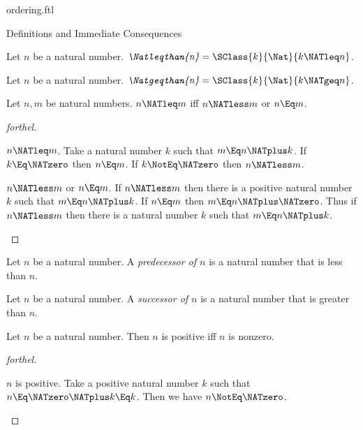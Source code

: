 \documentclass{stex}
\begin{document}
\begin{smodule}{ordering.ftl}
\begin{sfragment}{Definitions and Immediate Consequences}
  \begin{definition}[forthel]
    Let $n$ be a natural number.
    $\emph{\Natleqthan{n}} = \SClass{k}{\Nat}{k \NATleq n}$.
  \end{definition}

  \begin{definition}[forthel]
    Let $n$ be a natural number.
    $\emph{\Natgeqthan{n}} = \SClass{k}{\Nat}{k \NATgeq n }$.
  \end{definition}

  \begin{proposition}[forthel]
    Let $n, m$ be natural numbers.
    $n \NATleq m$ iff $n \NATless m$ or $n \Eq m$.
  \end{proposition}
  \begin{proof}[forthel]
    \begin{case}{$n \NATleq m$.}
      Take a natural number $k$ such that $m \Eq n \NATplus k$.
      If $k \Eq \NATzero$ then $n \Eq m$. If $k \NotEq \NATzero$ then $n \NATless m$.
    \end{case}

    \begin{case}{$n \NATless m$ or $n \Eq m$.}
      If $n \NATless m$ then there is a positive natural number $k$ such that $m \Eq n \NATplus k$.
      If $n \Eq m$ then $m \Eq n \NATplus \NATzero$.
      Thus if $n \NATless m$ then there is a natural number $k$ such that $m \Eq n \NATplus k$.
    \end{case}
  \end{proof}

  \begin{definition}[forthel]
    Let $n$ be a natural number.
    A \emph{predecessor of $n$} is a natural number that is less than $n$.
  \end{definition}

  \begin{definition}[forthel]
    Let $n$ be a natural number.
    A \emph{successor of $n$} is a natural number that is greater than $n$.
  \end{definition}

  \begin{proposition}[forthel]
    Let $n$ be a natural number.
    Then $n$ is positive iff $n$ is nonzero.
  \end{proposition}
  \begin{proof}[forthel]
    \begin{case}{$n$ is positive.}
      Take a positive natural number $k$ such that $n \Eq \NATzero \NATplus k \Eq k$.
      Then we have $n \NotEq \NATzero$.
    \end{case}


\end{proof}
\end{sfragment}
\end{smodule}
\end{document}
